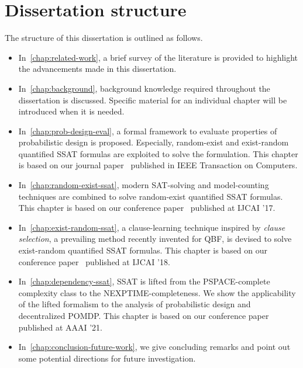 \section{Dissertation structure}
The structure of this dissertation is outlined as follows.
\begin{itemize}
    \item
          In~\cref{chap:related-work}, a brief survey of the literature is provided to highlight the advancements made in this dissertation.
    \item
          In~\cref{chap:background}, background knowledge required throughout the dissertation is discussed.
          Specific material for an individual chapter will be introduced when it is needed.
    \item
          In~\cref{chap:prob-design-eval}, a formal framework to evaluate properties of probabilistic design is proposed.
          Especially, random-exist and exist-random quantified SSAT formulas are exploited to solve the formulation.
          This chapter is based on our journal paper~\cite{LeeTC18ProbDesign} published in IEEE Transaction on Computers.
    \item
          In~\cref{chap:random-exist-ssat}, modern SAT-solving and model-counting techniques are combined to solve random-exist quantified SSAT formulas.
          This chapter is based on our conference paper~\cite{LeeIJCAI17RESSAT} published at IJCAI '17.
    \item
          In~\cref{chap:exist-random-ssat}, a clause-learning technique inspired by \textit{clause selection}, a prevailing method recently invented for QBF, is devised to solve exist-random quantified SSAT formulas.
          This chapter is based on our conference paper~\cite{LeeIJCAI18ERSSAT} published at IJCAI '18.
    \item
          In~\cref{chap:dependency-ssat}, SSAT is lifted from the PSPACE-complete complexity class to the NEXPTIME-completeness.
          We show the applicability of the lifted formalism to the analysis of probabilistic design and decentralized POMDP.
          This chapter is based on our conference paper~\cite{LeeAAAI21DSSAT} published at AAAI '21.
    \item
          In~\cref{chap:conclusion-future-work}, we give concluding remarks and point out some potential directions for future investigation.
\end{itemize}

\iffalse
